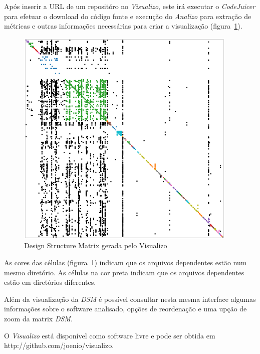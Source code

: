 \documentclass[conference]{IEEEtran}
\begin{document}
Após inserir a URL de um repositóro no {\it Visualizo}, este irá executar o
{\it CodeJuicer} para efetuar o download do código fonte e execução do {\it
Analizo} para extração de métricas e outras informações necessárias para criar
a visualização (figura~\ref{fig:dsm-visualizo}).

\begin{figure}[h]
\center
\includegraphics[scale=0.4]{dsm-visualizo.png}
\caption{Design Structure Matrix gerada pelo Visualizo}
\label{fig:dsm-visualizo}
\end{figure}

As cores das células (figura~\ref{fig:dsm-visualizo}) indicam que os arquivos
dependentes estão num mesmo diretório. As células na cor preta indicam que os
arquivos dependentes estão em diretórios diferentes.

Além da visualização da {\it DSM} é possível consultar nesta mesma interface
algumas informações sobre o software analisado, opções de reordenação e uma
upção de zoom da matrix {\it DSM}.

O {\it Visualizo} está disponível como software livre e pode ser obtida em
http://github.com/joenio/visualizo.


\end{document}
